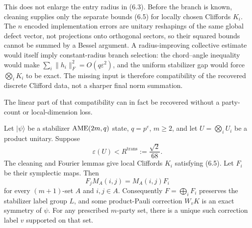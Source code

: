 This does not enlarge the entry radius in (6.3).  Before the branch is
known, cleaning supplies only the separate bounds (6.5) for locally
chosen Cliffords \(K_i\).  The \(n\) encoded implementation errors are
unitary reshapings of the same global defect vector, not projections onto
orthogonal sectors, so their squared bounds cannot be summed by a Bessel
argument.  A radius-improving collective estimate would itself imply
constant-radius branch selection: the chord--angle inequality would make
\(\sum_i\lVert h_i\rVert_F^2=O(q\varepsilon^2)\), and the uniform
stabilizer gap would force \(\bigotimes_iK_i\) to be exact.  The missing
input is therefore compatibility of the recovered discrete Clifford data,
not a sharper final norm summation.

The linear part of that compatibility can in fact be recovered without a
party-count or local-dimension loss.

\begin{proposition}
\label{prop:robust-linear-atlas}
Let \(\lvert\psi\rangle\) be a stabilizer \(\mathrm{AME}(2m,q)\) state,
\(q=p^e\), \(m\geq2\), and let \(U=\bigotimes_iU_i\) be a product unitary.  Suppose
\[
 \varepsilon(U)<
 R^{\mathrm{trans}}:=\frac{\sqrt2}{68}.
\]
The cleaning and Fourier lemmas give local Cliffords \(K_i\) satisfying
(6.5).  Let \(F_i\) be their symplectic maps.  Then
\[
 F_jM_A(i,j)=M_A(i,j)F_i
\]
for every \((m+1)\)-set \(A\) and \(i,j\in A\).  Consequently
\(F=\bigoplus_iF_i\) preserves the stabilizer label group \(L\), and some
product-Pauli correction \(W_vK\) is an exact symmetry of \(\psi\).
For any prescribed \(m\)-party set, there is a unique such correction
label \(v\) supported on that set.
\end{proposition}

